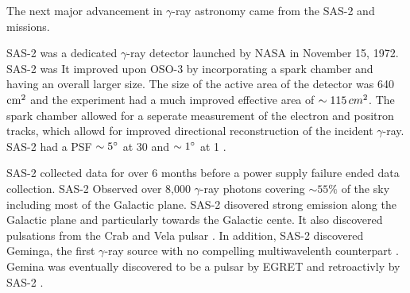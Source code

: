 

The next major advancement in $\gamma$-ray astronomy came from
the \ac{SAS-2} and \cosb missions.

\ac{SAS-2} was a dedicated $\gamma$-ray detector
launched by \ac{NASA} in November 15, 1972.  \ac{SAS-2} was
\cite{fichtel_1975_high-energy-gamma-ray} It improved upon \ac{OSO-3}
by incorporating a spark chamber and having an overall larger size.
The size of the active area of the detector was 640 $\text{cm}^2$ and the
experiment had a much improved effective area of $\sim 115\, cm^2$. The
spark chamber allowed for a seperate measurement of the electron and
positron tracks, which allowd for improved directional reconstruction
of the incident $\gamma$-ray. \ac{SAS-2} had a PSF $\sim5^\circ$ at 30
\mev and $\sim1^\circ$ at 1 \gev.

\ac{SAS-2} collected data for over 6 months before a power supply
failure ended data collection. \ac{SAS-2} Observed over 8,000
$\gamma$-ray photons covering $\sim55\%$ of
the sky including most of the Galactic plane.  
\ac{SAS-2} disovered strong emission
along the Galactic plane and particularly towards the Galactic
cente. It also discovered
pulsations from the
Crab \citep{fichtel_1975_high-energy-gamma-ray} and Vela pulsar
\citep{thompson_1977_sas-2-high-energy}.  In addition, \ac{SAS-2}
discovered Geminga, the first $\gamma$-ray source with no compelling
multiwavelenth counterpart \citep{thompson_1977_final-sas-2}. Gemina
was eventually discovered to be a pulsar by \ac{EGRET}
\citep{bertsch_1992_pulsed-high-energy} and retroactivly by \ac{SAS-2}
\citep{mattox_1992_observation-pulsed}.


